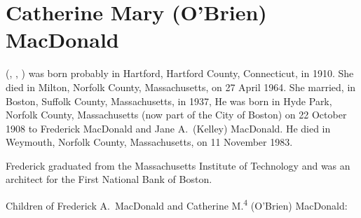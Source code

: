 \section{Catherine Mary (O'Brien) MacDonald}

 (, , ) was born probably in Hartford, Hartford County, Connecticut, in 1910.\cite{Census1910Edward3OBrien,Census1920Edward3OBrien} She died in Milton, Norfolk County, Massachusetts, on 27 April 1964.\cite{Catherine4OBrienDeath} She married, in Boston, Suffolk County, Massachusetts, in 1937, \cite{Catherine4OBrienMarriage} He was born in Hyde Park, Norfolk County, Massachusetts (now part of the City of Boston\cite{HydePark}) on 22 October 1908 to Frederick MacDonald and Jane A.\ (Kelley) MacDonald.\cite{FrederickMacDonaldBirth,FrederickMacDonaldDraft} He died in Weymouth, Norfolk County, Massachusetts, on 11 November 1983.\cite{FrederickMacDonaldDeath}

Frederick graduated from the Massachusetts Institute of Technology and was an architect for the First National Bank of Boston.\cite{FrederickMacDonaldDeath}

\begin{KidsIntro}
	Children of Frederick A.\ MacDonald and Catherine M.\textsuperscript{4} (O'Brien) MacDonald:
\end{KidsIntro}

\begin{Kids}
	
\end{Kids}